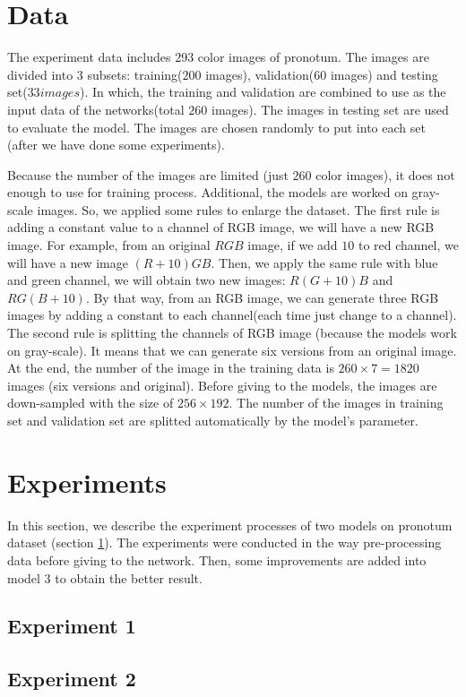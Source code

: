 \documentclass[12pt,a4paper]{article}
\begin{document}
\section{Data}
\label{sectionData}
The experiment data includes 293 color images of pronotum. The images are divided into 3 subsets: training($200$ images), validation($60$ images) and testing set($33 images$). In which, the training and validation are combined to use as the input data of the networks(total $260$ images). The images in testing set are used to evaluate the model. The images are chosen randomly to put into each set (after we have done some experiments).

Because the number of the images are limited (just $260$ color images), it does not enough to use for training process. Additional, the models are worked on gray-scale images. So, we applied some rules to enlarge the dataset. The first rule is adding a constant value to a channel of RGB image, we will have a new RGB image. For example, from an original $RGB$ image, if we add $10$ to red channel, we will have a new image $(R+10)GB$. Then, we apply the same rule with blue and green channel, we will obtain two new images: $R(G+10)B$ and $RG(B+10)$. By that way, from an RGB image, we can generate three RGB images by adding a constant to each channel(each time just change to a channel). The second rule is splitting the channels of RGB image (because the models work on gray-scale). It means that we can generate six versions from an original image. At the end, the number of the image in the training data is $ 260 \times 7 = 1820$ images (six versions and original). Before giving to the models, the images are down-sampled with the size of $256 \times 192$. The number of the images in training set and validation set are splitted automatically by the model's parameter.
\section{Experiments}
In this section, we describe the experiment processes of two models on pronotum dataset (section \ref{sectionData}). The experiments were conducted in the way pre-processing data before giving to the network. Then, some improvements are added into model 3 to obtain the better result.
\subsection{Experiment 1}
\subsection{Experiment 2}
\end{document}
